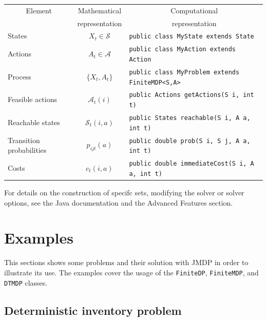 \documentclass[11pt]{article}
\begin{document}
\begin{center}
  \begin{tabular}{|l|c|l|}
    \hline
    \multicolumn{1}{|c|}{Element} &  \multicolumn{1}{|c|}{Mathematical} & \multicolumn{1}{|c|}{Computational}\\
    \multicolumn{1}{|c|}{} &  \multicolumn{1}{|c|}{representation} & \multicolumn{1}{|c|}{representation}\\
    \hline
    \hline
      States & $X_t \in \mathcal{S}$ & \lstinline!public class MyState extends State!\\
      \hline
      Actions & $A_t \in \mathcal{A}$ & \lstinline!public class MyAction extends Action!\\
      \hline
      Process & $\{X_t,A_t\}$ & \lstinline!public class MyProblem extends FiniteMDP<S,A>!\\
      \hline
      Feasible actions & $\mathcal{A}_t(i)$ & \lstinline!public Actions getActions(S i, int t)!\\
      \hline
      Reachable states & $\mathcal{S}_t(i,a)$ & \lstinline!public States reachable(S i, A a, int t)!\\
      \hline
      Transition probabilities & $p_{ijt}(a)$ & \lstinline!public double prob(S i, S j, A a, int t)!\\
      \hline
      Costs & $c_t(i,a)$ & \lstinline!public double immediateCost(S i, A a, int t)!\\
      \hline
  \end{tabular}
\end{center}

For details on the construction of specifc sets, modifying the solver or solver options, see the Java documentation and the Advanced Features section.

\section{Examples}

This sections shows some problems and their solution with JMDP in order to illustrate its use. The examples cover the usage of the \lstinline!FiniteDP!, \lstinline!FiniteMDP!, and \lstinline!DTMDP! classes.

\subsection{Deterministic inventory problem}
\end{document}
